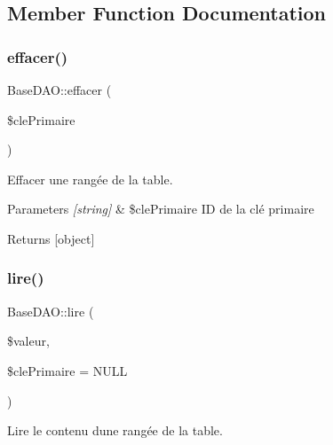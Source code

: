 \subsection{Member Function Documentation}
\mbox{\label{class_base_d_a_o_a79b3c59f05fbe64f3e3f5bc9dd4037bd}} 
\subsubsection{\texorpdfstring{effacer()}{effacer()}}
{\footnotesize\ttfamily Base\+D\+A\+O\+::effacer (\begin{DoxyParamCaption}\item[{}]{\$cle\+Primaire }\end{DoxyParamCaption})\hspace{0.3cm}{\ttfamily [protected]}}



Effacer une rangée de la table. 


\begin{DoxyParams}{Parameters}
{\em \mbox{[}string\mbox{]}} & \$cle\+Primaire ID de la clé primaire \\
\hline
\end{DoxyParams}
\begin{DoxyReturn}{Returns}
\mbox{[}object\mbox{]} 
\end{DoxyReturn}
\mbox{\label{class_base_d_a_o_aacee08a4ba93803b0bb46ecd253da4bb}} 
\subsubsection{\texorpdfstring{lire()}{lire()}}
{\footnotesize\ttfamily Base\+D\+A\+O\+::lire (\begin{DoxyParamCaption}\item[{}]{\$valeur,  }\item[{}]{\$cle\+Primaire = {\ttfamily NULL} }\end{DoxyParamCaption})\hspace{0.3cm}{\ttfamily [protected]}}



Lire le contenu d\textquotesingle{}une rangée de la table. 


